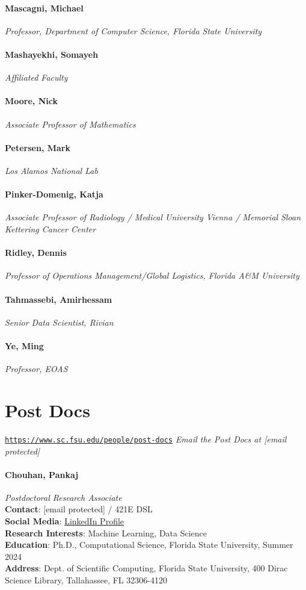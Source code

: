 \documentclass[12pt,a4paper]{article}
\begin{document}
\paragraph{Mascagni, Michael}
\textit{Professor, Department of Computer Science, Florida State University}
\paragraph{Mashayekhi, Somayeh}
\textit{Affiliated Faculty}
\paragraph{Moore, Nick}
\textit{Associate Professor of Mathematics}
\paragraph{Petersen, Mark}
\textit{Los Alamos National Lab}
\paragraph{Pinker-Domenig, Katja}
\textit{Associate Professor of Radiology / Medical University Vienna / Memorial Sloan Kettering Cancer Center}
\paragraph{Ridley, Dennis}
\textit{Professor of Operations Management/Global Logistics, Florida A\&M University}
\paragraph{Tahmassebi, Amirhessam}
\textit{Senior Data Scientist, Rivian}
\paragraph{Ye, Ming}
\textit{Professor, EOAS}


\section{Post Docs}
\texttt{\url{https://www.sc.fsu.edu/people/post-docs}}
\textit{Email the Post Docs at [email protected]}

\paragraph{Chouhan, Pankaj}
\textit{Postdoctoral Research Associate}\\
\textbf{Contact}: [email protected] / 421E DSL\\
\textbf{Social Media}: \href{https://www.linkedin.com/in/pankajchouhan/}{LinkedIn Profile}\\
\textbf{Research Interests}: Machine Learning, Data Science\\
\textbf{Education}: Ph.D., Computational Science, Florida State University, Summer 2024\\
\textbf{Address}: Dept. of Scientific Computing, Florida State University, 400 Dirac Science Library, Tallahassee, FL 32306-4120
\end{document}
